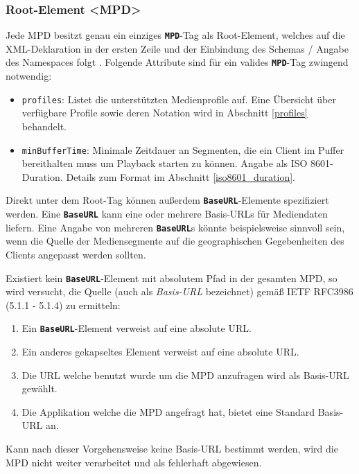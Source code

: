 \documentclass[paper = a4, fontsize = 12pt, parskip = half]{scrartcl} %
\def\attr#1{\texttt{#1}}
\def\elem#1{\texttt{\textbf{#1}}}
\begin{document}
\subsubsection{Root-Element <MPD>}
Jede MPD besitzt genau ein einziges \elem{MPD}-Tag als Root-Element, welches auf die XML-Deklaration in der ersten Zeile und der Einbindung des Schemas / Angabe des Namespaces folgt \cite{international_organization_for_standardization_isoiec_nodate}.
Folgende Attribute sind für ein valides \elem{MPD}-Tag zwingend notwendig:

\begin{itemize}
	\item \attr{profiles}: Listet die unterstützten Medienprofile auf. Eine Übersicht über verfügbare Profile sowie deren Notation wird in Abschnitt \ref{profiles} behandelt.
	\item \attr{minBufferTime}: Minimale Zeitdauer an Segmenten, die ein Client im Puffer bereithalten muss um Playback starten zu können. Angabe als ISO 8601-Duration. Details zum Format im Abschnitt \ref{iso8601_duration}.
\end{itemize}

Direkt unter dem Root-Tag können außerdem \elem{BaseURL}-Elemente spezifiziert werden. Eine \elem{BaseURL} kann eine oder mehrere Basis-URLs für Mediendaten liefern. Eine Angabe von mehreren \elem{BaseURL}s könnte beispielsweise sinnvoll sein, wenn die Quelle der Mediensegmente auf die geographischen Gegebenheiten des Clients angepasst werden sollten. 

Existiert kein \elem{BaseURL}-Element mit absolutem Pfad in der gesamten MPD, so wird versucht, die Quelle (auch als \textit{Basis-URL} bezeichnet) gemäß IETF RFC3986 (5.1.1 - 5.1.4) zu ermitteln:

\label{base_url_finding}

\begin{enumerate}
	\item Ein \elem{BaseURL}-Element verweist auf eine absolute URL.
	\item Ein anderes gekapseltes Element verweist auf eine absolute URL. 
	\item Die URL welche benutzt wurde um die MPD anzufragen wird als Basis-URL gewählt.
	\item Die Applikation welche die MPD angefragt hat, bietet eine Standard Basis-URL an.
\end{enumerate}

Kann nach dieser Vorgehensweise keine Basis-URL bestimmt werden, wird die MPD nicht weiter verarbeitet und als fehlerhaft abgewiesen.
\end{document}
